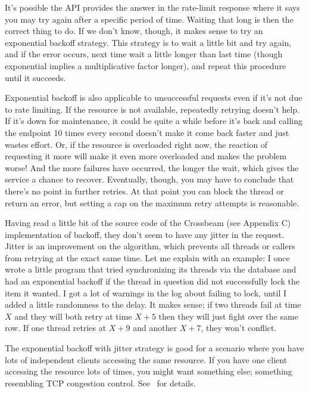 It's possible the API provides the answer in the rate-limit response where it says you may try again after a specific period of time. Waiting that long is then the correct thing to do. If we don't know, though, it makes sense to try an exponential backoff strategy. This strategy is to wait a little bit and try again, and if the error occurs, next time wait a little longer than last time (though exponential implies a multiplicative factor longer), and repeat this procedure until it succeeds.

Exponential backoff is also applicable to unsuccessful requests even if it's not due to rate limiting. If the resource is not available, repeatedly retrying doesn't help. If it's down for maintenance, it could be quite a while before it's back and calling the endpoint 10 times every second doesn't make it come back faster and just wastes effort. Or, if the resource is overloaded right now, the reaction of requesting it more will make it even more overloaded and makes the problem worse! And the more failures have occurred, the longer the wait, which gives the service a chance to recover. Eventually, though, you may have to conclude that there's no point in further retries. At that point you can block the thread or return an error, but setting a cap on the maximum retry attempts is reasonable.

Having read a little bit of the source code of the Crossbeam (see Appendix C) implementation of backoff, they don't seem to have any jitter in the request. Jitter is an improvement on the algorithm, which prevents all threads or callers from retrying at the exact same time. Let me explain with an example: I once wrote a little program that tried synchronizing its threads via the database and had an exponential backoff if the thread in question did not successfully lock the item it wanted. I got a lot of warnings in the log about failing to lock, until I added a little randomness to the delay. It makes sense; if two threads fail at time $X$ and they will both retry at time $X+5$ then they will just fight over the same row. If one thread retries at $X+9$ and another $X+7$, they won't conflict.

The exponential backoff with jitter strategy is good for a scenario where you have lots of independent clients accessing the same resource. If you have one client accessing the resource lots of times, you might want something else; something resembling TCP congestion control. See~\cite{expbackoff} for details. 





